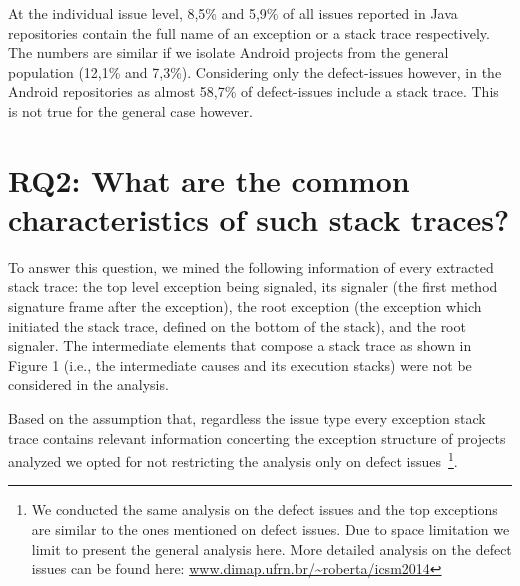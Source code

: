 \documentclass[conference]{IEEEtran}
\begin{document}
At the individual issue level, 8,5\% and 5,9\% of all issues reported in Java
repositories contain the full name of an exception or a stack trace
respectively. The numbers are similar if we isolate Android projects from the
general population (12,1\% and 7,3\%). Considering only the defect-issues
however, in the Android repositories as almost 58,7\% of defect-issues include a
stack trace. This is not true for the general case however.




\noindent {}

\section{RQ2: What are the common characteristics of such stack traces?}

To answer this question, we mined the following information of every extracted
stack trace: the top level exception being signaled, its signaler (the first
method signature frame after the exception), the root exception (the exception
which initiated the stack trace, defined on the bottom of the stack), and the
root signaler. The intermediate elements that compose a stack trace as shown in
Figure 1 (i.e., the intermediate causes and its execution stacks) were not be
considered in the analysis.

Based on the assumption that, regardless the issue type every exception stack
trace contains relevant information concerting the exception structure of
projects analyzed we opted for not restricting the analysis only on defect
issues~\footnote{We conducted the same analysis on the defect issues and the top
exceptions are similar to the ones mentioned on defect issues. Due to space
limitation we limit to present the general analysis here. More detailed analysis
on the defect issues can be found here:
\url{www.dimap.ufrn.br/~roberta/icsm2014}}.
\end{document}
